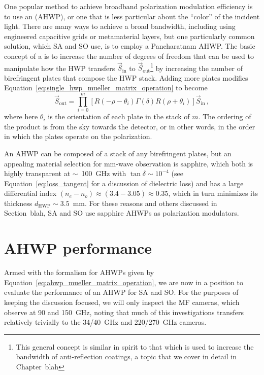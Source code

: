 One popular method to achieve broadband polarization modulation efficiency is to use an  (AHWP), or one that is less particular about the ``color'' of the incident light. There are many ways to achieve a broad bandwidth, including using engineered capacitive grids or metamaterial layers, but one particularly common solution, which SA and SO use, is to employ a Pancharatnam AHWP. The basic concept of a  is to increase the number of degrees of freedom that can be used to manipulate how the HWP transfers $\vec{S}_{\mathrm{in}}$ to $\vec{S}_{\mathrm{out}}$\footnote{This general concept is similar in spirit to that which is used to increase the bandwidth of anti-reflection coatings, a topic that we cover in detail in Chapter~blah} by increasing the number of birefringent plates that compose the HWP stack. Adding more plates modifies Equation~\ref{eq:single_hwp_mueller_matrix_operation} to become
\begin{equation}
    \vec{S}_{\mathrm{out}} = \prod_{i = 0}^{m} \left[ R(- \rho - \theta_{i}) \Gamma (\delta) R(\rho + \theta_{i}) \right] \vec{S}_{\mathrm{in}} \, ,
    \label{eq:ahwp_mueller_matrix_operation}
\end{equation}
where here $\theta_{i}$ is the orientation of each plate in the stack of $m$. The ordering of the product is from the sky towards the detector, or in other words, in the order in which the plates operate on the polarization.

An AHWP can be composed of a stack of any birefringent plates, but an appealing material selection for mm-wave observation is sapphire, which both is highly transparent at $\sim$~100~GHz with $\tan \delta \sim 10^{-4}$ (see Equation~\ref{eq:loss_tangent} for a discussion of dielectric loss) and has a large differential index $(n_{e} - n_{o}) \approx (3.4 - 3.05) \approx 0.35$, which in turn minimizes its thickness $d_{\mathrm{HWP}} \sim 3.5$~mm. For these reasons and others discussed in Section~blah, SA and SO use sapphire AHWPs as polarization modulators.


\section{AHWP performance}
\label{sec:ahwp_performance}

Armed with the formalism for AHWPs given by Equation~\ref{eq:ahwp_mueller_matrix_operation}, we are now in a position to evaluate the performance of an AHWP for SA and SO. For the purposes of keeping the discussion focused, we will only inspect the MF cameras, which observe at 90 and 150~GHz, noting that much of this investigations transfers relatively trivially to the 34/40~GHz and 220/270~GHz cameras. 

